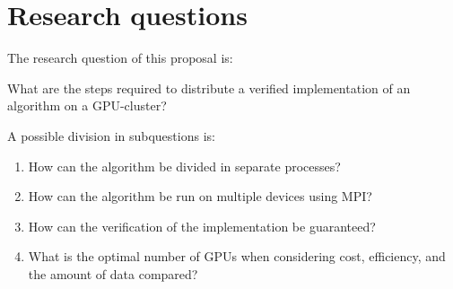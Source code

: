 \section{Research questions}
The research question of this proposal is:

What are the steps required to distribute a verified implementation of an algorithm on a GPU-cluster?

A possible division in subquestions is:
\begin{enumerate}
    \item How can the algorithm be divided in separate processes?
    \item How can the algorithm be run on multiple devices using MPI?
    \item How can the verification of the implementation be guaranteed?
    \item What is the optimal number of GPUs when considering cost, efficiency, and the amount of data compared?
\end{enumerate}


